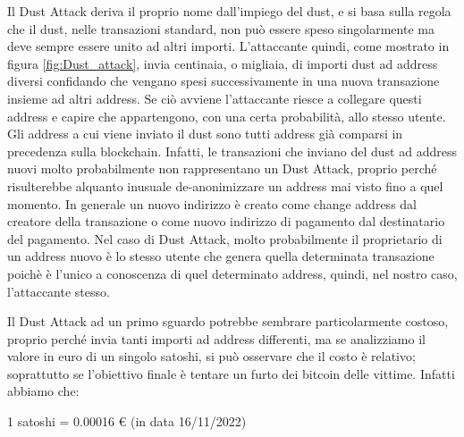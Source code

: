 Il Dust Attack deriva il proprio nome dall'impiego del dust, e si basa sulla regola che il dust, nelle transazioni standard, non può essere speso singolarmente ma deve sempre essere unito ad altri importi. L'attaccante quindi, come mostrato in figura \ref{fig:Dust_attack}, invia centinaia, o migliaia, di importi dust ad address diversi confidando che vengano spesi successivamente in una nuova transazione insieme ad altri address. Se ciò avviene l'attaccante riesce a collegare questi address e capire che appartengono, con una certa probabilità, allo stesso utente. Gli address a cui viene inviato il dust sono tutti address già comparsi in precedenza sulla blockchain. Infatti, le transazioni che inviano del dust ad address nuovi molto probabilmente non rappresentano un Dust Attack, proprio perché risulterebbe alquanto inusuale de-anonimizzare un address mai visto fino a quel momento. In generale un nuovo indirizzo è creato come change address dal creatore della transazione o come nuovo indirizzo di pagamento dal destinatario del pagamento. Nel caso di Dust Attack, molto probabilmente il proprietario di un address nuovo è lo stesso utente che genera quella determinata transazione poichè è l'unico a conoscenza di quel determinato address, quindi, nel nostro caso, l'attaccante stesso.

Il Dust Attack ad un primo sguardo potrebbe sembrare particolarmente costoso, proprio perché invia tanti importi ad address differenti, ma se analizziamo il valore in euro di un singolo satoshi, si può osservare che il costo è relativo; soprattutto se l'obiettivo finale è tentare un furto dei bitcoin delle vittime. Infatti abbiamo che:
\begin{center}
    1 satoshi = 0.00016 € (in data 16/11/2022) 
\end{center}

